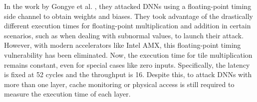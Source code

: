 In the work by Gongye et al. \cite{9218707}, they attacked DNNs using a floating-point timing side channel to obtain weights and biases. They took advantage of the drastically different execution times for floating-point multiplication and addition in certain scenarios, such as when dealing with subnormal values, to launch their attack. However, with modern accelerators like Intel AMX, this floating-point timing vulnerability has been eliminated. Now, the execution time for tile multiplication remains constant, even for special cases like zero inputs. Specifically, the latency is fixed at 52 cycles and the throughput is 16. Despite this, to attack DNNs with more than one layer, cache monitoring or physical access is still required to measure the execution time of each layer.